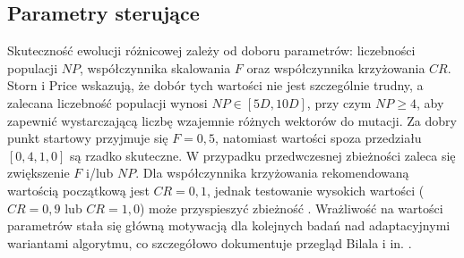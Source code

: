 \subsection{Parametry sterujące}

Skuteczność ewolucji różnicowej zależy od doboru parametrów: liczebności populacji $NP$, współczynnika skalowania $F$ oraz współczynnika krzyżowania $CR$. Storn i Price wskazują, że dobór tych wartości nie jest szczególnie trudny, a zalecana liczebność populacji wynosi $NP \in [5D, 10D]$, przy czym $NP \geq 4$, aby zapewnić wystarczającą liczbę wzajemnie różnych wektorów do mutacji. Za dobry punkt startowy przyjmuje się $F = 0,5$, natomiast wartości spoza przedziału $[0,4, 1,0]$ są rzadko skuteczne. W przypadku przedwczesnej zbieżności zaleca się zwiększenie $F$ i/lub $NP$. Dla współczynnika krzyżowania rekomendowaną wartością początkową jest $CR = 0,1$, jednak testowanie wysokich wartości ($CR = 0,9$ lub $CR = 1,0$) może przyspieszyć zbieżność \cite{Storn1997}. Wrażliwość na wartości parametrów stała się główną motywacją dla kolejnych badań nad adaptacyjnymi wariantami algorytmu, co szczegółowo dokumentuje przegląd Bilala i in. \cite{Bilal2020}.
